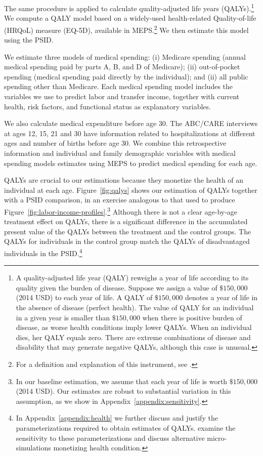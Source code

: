 The same procedure is applied to calculate quality-adjusted life years (QALYs).\footnote{A quality-adjusted life year (QALY) reweighs a year of life according to its quality given the burden of disease. Suppose we assign a value of $\$150,000$ (2014 USD) to each year of life. A QALY of $\$150,000$ denotes a year of life in the absence of disease (perfect health). The value of QALY for an individual in a given year is smaller than $\$150,000$ when there is positive burden of disease, as worse health conditions imply lower QALYs. When an individual dies, her QALY equals zero. There are extreme combinations of disease and disability that may generate negative QALYs, although this case is unusual.} We compute a QALY model based on a widely-used health-related Quality-of-life (HRQoL) measure (EQ-5D), available in MEPS.\footnote{For a definition and explanation of this instrument, see \citet{Dolan_1997_Modeling_MC,Shaw_etal_2005_EQ5D_MC}.} We then estimate this model using the PSID.

We estimate three models of medical spending: (i) Medicare spending (annual medical spending paid by parts A, B, and D of Medicare); (ii) out-of-pocket spending (medical spending paid directly by the individual); and (ii) all public spending other than Medicare. Each medical spending model includes the variables we use to predict labor and transfer income, together with current health, risk factors, and functional status as explanatory variables.

We also calculate medical expenditure before age 30. The ABC/CARE interviews at ages 12, 15, 21 and 30 have information related to hospitalizations at different ages and number of births before age 30. We combine this retrospective information and individual and family demographic variables with medical spending models estimates using MEPS to predict medical spending for each age.

QALYs are crucial to our estimations because they monetize the health of an individual at each age. Figure~\ref{fig:qalys} shows our estimation of QALYs together with a PSID comparison, in an exercise analogous to that used to produce Figure~\ref{fig:labor-income-profiles}.\footnote{In our baseline estimation, we assume that each year of life is worth  $\$150,000$ (2014 USD). Our estimates are robust to substantial variation in this assumption, as we show in Appendix~\ref{appendix:sensitivity}.} Although there is not a clear age-by-age treatment effect on QALYs, there is a significant difference in the accumulated present value of the QALYs between the treatment and the control groups. The QALYs for individuals in the control group match the QALYs of disadvantaged individuals in the PSID.\footnote{In Appendix~\ref{appendix:health} we further discuss and justify the parameterizations required to obtain estimates of QALYs. \citet{Goldman_etal_2015_Future-America-Model} examine the sensitivity to these parameterizations and discuss alternative micro-simulations monetizing health condition.}

